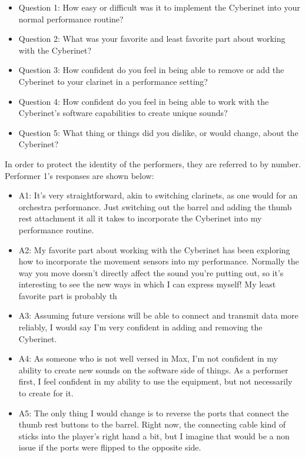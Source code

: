 \begin{itemize}
    \item Question 1: How easy or difficult was it to implement the Cyberinet into your normal performance routine?
    \item Question 2: What was your favorite and least favorite part about working with the Cyberinet? 
    \item Question 3: How confident do you feel in being able to remove or add the Cyberinet to your clarinet in a performance setting?
    \item Question 4: How confident do you feel in being able to work with the Cyberinet's software capabilities to create unique sounds?
    \item Question 5: What thing or things did you dislike, or would change, about the Cyberinet?
\end{itemize}

In order to protect the identity of the performers, they are referred to by number. Performer 1's responses are shown below: %

\begin{itemize}
    \item A1: It's very straightforward, akin to switching clarinets, as one would for an orchestra performance. Just switching out the barrel and adding the thumb rest attachment it all it takes to incorporate the Cyberinet into my performance routine.
    \item A2: My favorite part about working with the Cyberinet has been exploring how to incorporate the movement sensors into my performance. Normally the way you move doesn't directly affect the sound you're putting out, so it's interesting to see the new ways in which I can express myself! My least favorite part is probably th
    \item A3: Assuming future versions will be able to connect and transmit data more reliably, I would say I'm very confident in adding and removing the Cyberinet.
    \item A4: As someone who is not well versed in Max, I'm not confident in my ability to create new sounds on the software side of things. As a performer first, I feel confident in my ability to use the equipment, but not necessarily to create for it.
    \item A5: The only thing I would change is to reverse the ports that connect the thumb rest buttons to the barrel. Right now, the connecting cable kind of sticks into the player's right hand a bit, but I imagine that would be a non issue if the ports were flipped to the opposite side.
\end{itemize}


